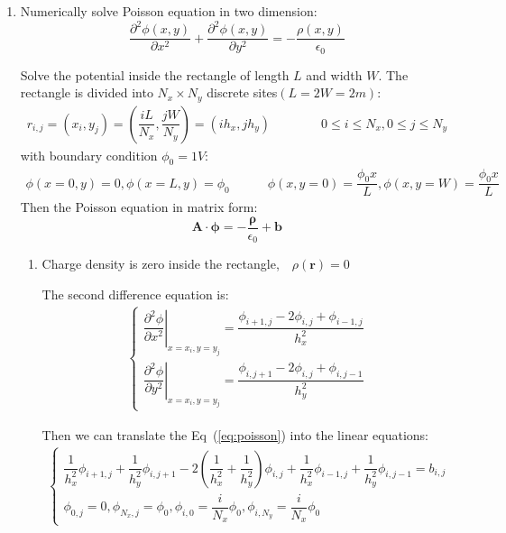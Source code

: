 \documentclass[a4paper,11pt]{article}
\begin{document}
\begin{enumerate}
  \item Numerically solve Poisson equation in two dimension:
  \begin{equation}\label{eq:poisson}
    \dfrac{\partial^2\phi(x,y)}{\partial x^2}+\dfrac{\partial^2\phi(x,y)}{\partial y^2}=-\dfrac{\rho(x,y)}{\epsilon_0}
  \end{equation}

  Solve the potential inside the rectangle of length $L$ and width $W$. The rectangle is divided into $N_x\times N_y$ discrete sites$(L=2W=2m)$:
  \begin{eqnarray}
    r_{i,j}=(x_i,y_j)=(\dfrac{iL}{N_x},\dfrac{jW}{N_y})=(ih_x,jh_y) \quad\quad\quad\quad 0 \leqslant i \leqslant N_x, 0 \leqslant j \leqslant N_y
  \end{eqnarray}
  with boundary condition $\phi_0=1V$:
  \begin{eqnarray}
    \phi(x=0,y)=0,\phi(x=L,y)=\phi_0 \quad\quad\quad \phi(x,y=0)=\dfrac{\phi_0 x}{L},\phi(x,y=W)=\dfrac{\phi_0 x}{L}
  \end{eqnarray}
  Then the Poisson equation in matrix form:
  \begin{equation}
    \boldsymbol{A}\cdot\boldsymbol{\phi}=-\dfrac{\boldsymbol{\rho}}{\epsilon_0}+\boldsymbol{b}
  \end{equation}

  \begin{enumerate}
    \item Charge density is zero inside the rectangle,$\quad\rho(\boldsymbol{r})=0$
    
    The second difference equation is:
    \begin{eqnarray}
      \begin{cases}
        \left.\dfrac{\partial^2\phi}{\partial x^2}\right|_{x=x_i,y=y_j}=\dfrac{\phi_{i+1,j}-2\phi_{i,j}+\phi_{i-1,j}}{h_x^{2}} \\
        \left.\dfrac{\partial^2\phi}{\partial y^2}\right|_{x=x_i,y=y_j}=\dfrac{\phi_{i,j+1}-2\phi_{i,j}+\phi_{i,j-1}}{h_y^{2}}
      \end{cases}
    \end{eqnarray}

    Then we can translate the Eq~(\ref{eq:poisson}) into the linear equations:
    \begin{eqnarray}
      \begin{cases}
        \dfrac{1}{h_x^2}\phi_{i+1,j}+\dfrac{1}{h_y^2}\phi_{i,j+1}-2(\dfrac{1}{h_x^2}+\dfrac{1}{h_y^2})\phi_{i,j}+\dfrac{1}{h_x^2}\phi_{i-1,j}+\dfrac{1}{h_y^2}\phi_{i,j-1}=b_{i,j}\\
        \phi_{0,j}=0,\phi_{N_x,j}=\phi_0,\phi_{i,0}=\dfrac{i}{N_x}\phi_0,\phi_{i,N_y}=\dfrac{i}{N_x}\phi_0
      \end{cases}
    \end{eqnarray}


\end{enumerate}
\end{enumerate}
\end{document}
